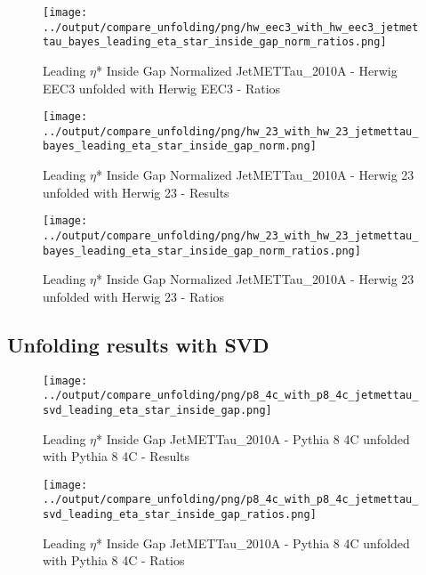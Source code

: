 \documentclass[11pt]{book}
\begin{document}
\begin{figure}[ht]
\centering
\texttt{[image: ../output/compare\_unfolding/png/hw\_eec3\_with\_hw\_eec3\_jetmettau\_bayes\_leading\_eta\_star\_inside\_gap\_norm\_ratios.png]}
\caption{Leading $\eta$* Inside Gap Normalized JetMETTau\_2010A - Herwig EEC3 unfolded with Herwig EEC3 - Ratios}
\label{hw_eec3_hw_eec3_jetmettau_bayes_leading_eta_star_inside_gap_norm_b}
\end{figure}

\begin{figure}[ht]
\centering
\texttt{[image: ../output/compare\_unfolding/png/hw\_23\_with\_hw\_23\_jetmettau\_bayes\_leading\_eta\_star\_inside\_gap\_norm.png]}
\caption{Leading $\eta$* Inside Gap Normalized JetMETTau\_2010A - Herwig 23 unfolded with Herwig 23 - Results}
\label{hw_23_hw_23_jetmettau_bayes_leading_eta_star_inside_gap_norm_a}
\end{figure}

\begin{figure}[ht]
\centering
\texttt{[image: ../output/compare\_unfolding/png/hw\_23\_with\_hw\_23\_jetmettau\_bayes\_leading\_eta\_star\_inside\_gap\_norm\_ratios.png]}
\caption{Leading $\eta$* Inside Gap Normalized JetMETTau\_2010A - Herwig 23 unfolded with Herwig 23 - Ratios}
\label{hw_23_hw_23_jetmettau_bayes_leading_eta_star_inside_gap_norm_b}
\end{figure}


\clearpage
\subsection{Unfolding results with SVD}

\begin{figure}[ht]
\centering
\texttt{[image: ../output/compare\_unfolding/png/p8\_4c\_with\_p8\_4c\_jetmettau\_svd\_leading\_eta\_star\_inside\_gap.png]}
\caption{Leading $\eta$* Inside Gap JetMETTau\_2010A - Pythia 8 4C unfolded with Pythia 8 4C - Results}
\label{p8_p8_jetmettau_svd_leading_eta_star_inside_gap_a}
\end{figure}

\begin{figure}[ht]
\centering
\texttt{[image: ../output/compare\_unfolding/png/p8\_4c\_with\_p8\_4c\_jetmettau\_svd\_leading\_eta\_star\_inside\_gap\_ratios.png]}
\caption{Leading $\eta$* Inside Gap JetMETTau\_2010A - Pythia 8 4C unfolded with Pythia 8 4C - Ratios}
\label{p8_p8_jetmettau_svd_leading_eta_star_inside_gap_b}
\end{figure}
\end{document}
